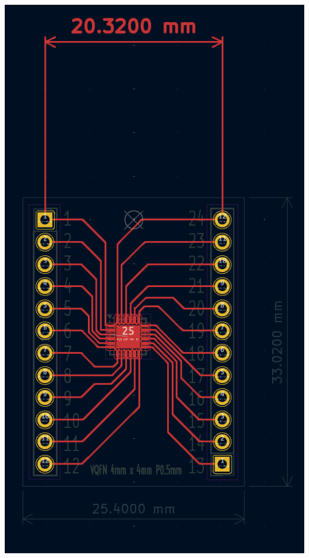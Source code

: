 \documentclass[11pt,a4paper,titlepage]{report}
\begin{document}
	\begin{center}
		\label{picture:breakout2}
		\includegraphics[width= \linewidth]{assets/breakout_pcb_schema.png}
	\end{center}
\end{document}
